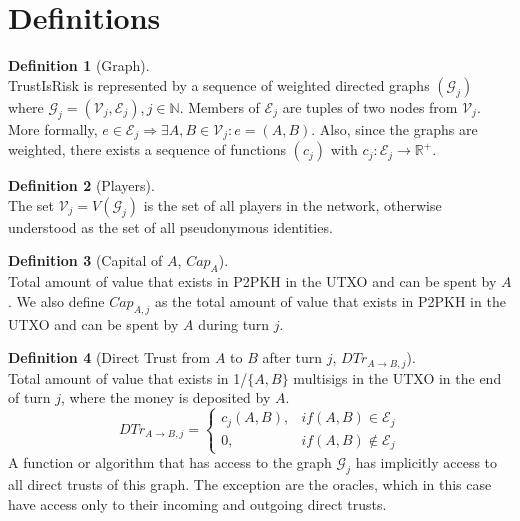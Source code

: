 \documentclass[11pt]{article}
\theoremstyle{definition}
\newtheorem{definition}{Definition}[section]
\theoremstyle{corollary}
\theoremstyle{lemma}
\begin{document}
  \section{Definitions}
     \begin{definition}[Graph] \ \\
        TrustIsRisk is represented by a sequence of weighted directed graphs $(\mathcal{G}_j)$ where $\mathcal{G}_j =
        (\mathcal{V}_j, \mathcal{E}_j), j \in \mathbb{N}$. Members of $\mathcal{E}_j$ are tuples of two nodes from
        $\mathcal{V}_j$. More formally, $e \in \mathcal{E}_j \Rightarrow \exists A,B \in \mathcal{V}_j : e = (A,B)$.
        Also, since the graphs are weighted, there exists a sequence of functions $(c_j)$ with $c_j : \mathcal{E}_j
        \rightarrow \mathbb{R}^{+}$.
     \end{definition}
     \begin{definition}[Players] \ \\
        The set $\mathcal{V}_j = V(\mathcal{G}_j)$ is the set of all players in the network, otherwise understood as the
        set of all pseudonymous identities.
     \end{definition}
     \begin{definition}[Capital of $A$, $Cap_A$] \ \\
       Total amount of value that exists in P2PKH in the UTXO and can be spent by $A$. We also define $Cap_{A,j}$ as
       the total amount of value that exists in P2PKH in the UTXO and can be spent by $A$ during turn $j$.
     \end{definition}
     \begin{definition}[Direct Trust from $A$ to $B$ after turn $j$, $DTr_{A \rightarrow B, j}$] \ \\
        Total amount of value that exists in 1/$\{A,B\}$ multisigs in the UTXO in the end of turn $j$, where the money is
        deposited by $A$.
        $$DTr_{A \rightarrow B, j} =
           \begin{cases}
              c_j(A, B), & if (A, B) \in \mathcal{E}_j \\
              0, & if (A, B) \notin \mathcal{E}_j
           \end{cases}$$
        A function or algorithm that has access to the graph $\mathcal{G}_j$ has implicitly access to all direct trusts
        of this graph. The exception are the oracles, which in this case have access only to their incoming and outgoing
        direct trusts.
     \end{definition}
\end{document}

